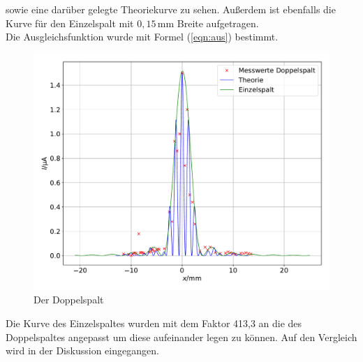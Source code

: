 sowie eine darüber gelegte Theoriekurve zu sehen.
Außerdem ist ebenfalls die Kurve für den Einzelspalt mit $0,15\, \mathrm{mm}$ Breite
aufgetragen.\\
Die Ausgleichsfunktion wurde mit Formel (\ref{eqn:aus}) bestimmt.
\begin{figure}
\centering
\includegraphics[width=\textwidth]{doppel2.pdf}
\caption{Der Doppelspalt}
\label{fig:dop}
\end{figure}
Die Kurve des Einzelspaltes wurden mit dem Faktor 413,3
an die des Doppelspaltes angepasst um diese aufeinander legen zu können.
Auf den Vergleich wird in der Diskussion eingegangen.



